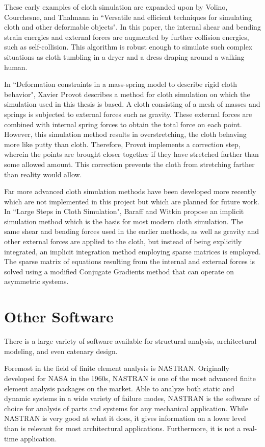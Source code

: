 \documentclass{thesis}
\begin{document}
These early examples of cloth simulation are expanded upon by Volino, Courchesne, and Thalmann in ``Versatile
and efficient techniques for simulating cloth and other deformable objects"\cite{volino95cloth}.  In this
paper, the internal shear and bending strain energies and external forces are augmented by further collision
energies, such as self-collision.  This algorithm is robust enough to simulate such complex situations as
cloth tumbling in a dryer and a dress draping around a walking human.

In ``Deformation constraints in a mass-spring model to describe rigid cloth behavior"\cite{provot95deformationconstraints},
Xavier Provot describes a method for cloth simulation on which the simulation used in this thesis is based.
A cloth consisting of a mesh of masses and springs is subjected to external forces such as gravity.  These
external forces are combined with internal spring forces to obtain the total force on each point.  However,
this simulation method results in overstretching, the cloth behaving more like putty than cloth.  Therefore,
Provot implements a correction step, wherein the points are brought closer together if they have stretched
farther than some allowed amount.  This correction prevents the cloth from stretching farther than reality
would allow.

Far more advanced cloth simulation methods have been developed more recently which are not implemented in
this project but which are planned for future work.  In ``Large Steps in Cloth Simulation"\cite{baraff98largesteps},
Baraff and Witkin propose an implicit simulation method which is the basis for most modern cloth simulation.
The same shear and bending forces used in the earlier methods, as well as gravity and other external forces
are applied to the cloth, but instead of being explicitly integrated, an implicit integration method employing
sparse matrices is employed.  The sparse matrix of equations resulting from the internal and external forces
is solved using a modified Conjugate Gradients method that can operate on asymmetric systems.

\section{Other Software}
There is a large variety of software available for structural analysis, architectural modeling, and even
catenary design.

Foremost in the field of finite element analysis is NASTRAN\cite{NASTRAN}.  Originally developed for NASA in
the 1960s, NASTRAN is one of the most advanced finite element analysis packages on the market.  Able to
analyze both static and dynamic systems in a wide variety of failure modes, NASTRAN is the software
of choice for analysis of parts and systems for any mechanical application.  While NASTRAN is very good
at what it does, it gives information on a lower level than is relevant for most architectural applications.
Furthermore, it is not a real-time application.
\end{document}
